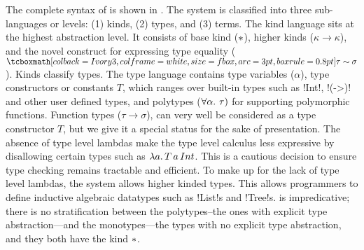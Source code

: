 \documentclass[screen,nonacm]{acmart}
\begin{document}
The complete syntax of \SFC is shown in . The
system is classified into three sub-languages or levels: (1) kinds,
(2) types, and (3) terms. The kind language sits at the highest
abstraction level. It consists of base kind ($\ast$), higher kinds
($\kappa \to \kappa$), and the novel construct for expressing type
equality ($\shl{\tau \sim \sigma}$). Kinds classify types. The type
language contains type variables ($\alpha$), type constructors or
constants $T$, which ranges over built-in types such as !Int!, !(->)!
and other user defined types, and polytypes ($\forall\alpha.~\tau)$
for supporting polymorphic functions. Function types ($\tau \to
\sigma$), can very well be considered as a type constructor $T$, but
we give it a special status for the sake of presentation. The absence
of type level lambdas make the type level calculus less expressive by
disallowing certain types such as $\lambda a.\, T\, a\, Int$. This is
a cautious decision to ensure type checking remains tractable and
efficient. To make up for the lack of type level lambdas, the system
allows higher kinded types. This allows programmers to define
inductive algebraic datatypes such as !List!s and !Tree!s. \SFC is
impredicative; there is no stratification between the polytypes--the
ones with explicit type abstraction---and
the monotypes---the types with no explicit type abstraction, and they
both have the kind $\ast$.
\end{document}
